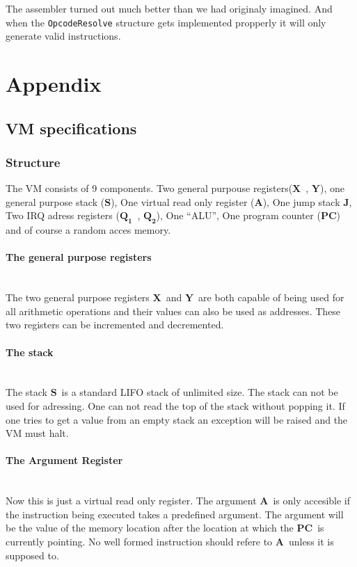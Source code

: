\documentclass{article}
\newcommand{\V}{\verb}
\newcommand{\x}{$\textbf{X}$}
\newcommand{\y}{$\textbf{Y}$}
\newcommand{\s}{$\textbf{S}$}
\newcommand{\A}{$\textbf{A}$}
\newcommand{\q}{$\textbf{Q}_{\textbf{1}}$}
\newcommand{\qq}{$\textbf{Q}_{\textbf{2}}$}
\newcommand{\pc}{$\textbf{PC}$}
\newcommand{\J}{$\textbf{J}$}
\begin{document}
The assembler turned out much better than we had originaly imagined. And when
the \V+OpcodeResolve+ structure gets implemented propperly it will only generate
valid instructions.
\section{Appendix}
\subsection{VM specifications}
\subsubsection{Structure} 
The VM consists of 9 components. Two general purpouse registers(\x \ , \y ), one
general purpose stack (\s), One virtual read only register (\A), One jump stack
\J, Two IRQ adress registers (\q \ , \qq), One ``ALU'', One program counter
(\pc) and of course a random acces memory.

\paragraph{The general purpose registers} \
\\
The two general purpose registers \x \ and \y \ are both capable of being used
for all arithmetic operations and their values can also be used as addresses.
These two registers can be incremented and decremented.

\paragraph{The stack} \
\\
The stack \s \ is a standard LIFO stack of unlimited size. The stack can not be
used for adressing. One can not read the top of the stack without popping it. If
one tries to get a value from an empty stack an exception will be raised and the
VM must halt.

\paragraph{The Argument Register} \
\\
Now this is just a virtual read only register. The argument \A \  is only
accesible if the instruction being executed takes a predefined argument. The
argument will be the value of the memory location after the location at which
the \pc \  is currently pointing. No well formed instruction should refere to
\A \ unless it is supposed to.
\end{document}
